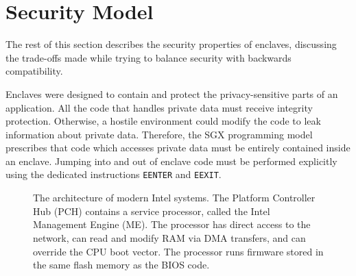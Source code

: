 \section{Security Model}
\label{sec:attestation}

The rest of this section describes the security properties of
enclaves, discussing the trade-offs made while trying to balance security with
backwards compatibility.

Enclaves were designed to contain and protect the privacy-sensitive parts of an
application. All the code that handles private data must receive integrity
protection. Otherwise, a hostile environment could modify the code to leak
information about private data. Therefore, the SGX programming model prescribes
that code which accesses private data must be entirely contained inside an
enclave. Jumping into and out of enclave code must be performed explicitly
using the dedicated instructions \texttt{EENTER} and \texttt{EEXIT}.

\begin{figure}[hbtp]
  \caption{
    The architecture of modern Intel systems.
    The Platform Controller Hub (PCH) contains a service processor, called the
    Intel Management Engine (ME). The processor has direct access to the
    network, can read and modify RAM via DMA transfers, and can override the
    CPU boot vector. The processor runs firmware stored in the same flash
    memory as the BIOS code.
  }
  \label{fig:pch}
\end{figure}



